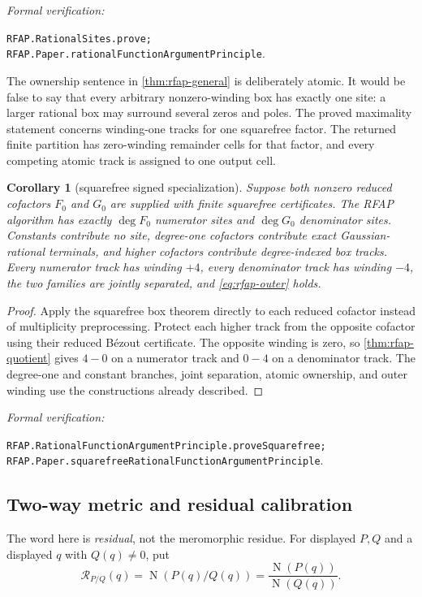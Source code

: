 \documentclass[11pt]{article}
\newtheorem{corollary}[theorem]{Corollary}
\newcommand{\Norm}[1]{\operatorname{N}\!\left(#1\right)}
\newcommand{\leanref}[1]{\par\smallskip\noindent
  \emph{Formal verification:}\par\nobreak
  {\raggedright\nolinkurl{#1}.\par}}
\begin{document}
\leanref{RFAP.RationalSites.prove;
RFAP.Paper.rationalFunctionArgumentPrinciple}

The ownership sentence in \cref{thm:rfap-general} is deliberately atomic.
It would be false to say that every arbitrary nonzero-winding box has exactly
one site: a larger rational box may surround several zeros and poles.  The
proved maximality statement concerns winding-one tracks for one squarefree
factor.  The returned finite partition has zero-winding remainder cells for
that factor, and every competing atomic track is assigned to one output cell.

\begin{corollary}[squarefree signed specialization]
\label{cor:rfap-squarefree}
Suppose both nonzero reduced cofactors $F_0$ and $G_0$ are supplied with
finite squarefree certificates.  The RFAP algorithm has exactly $\deg F_0$
numerator sites and $\deg G_0$ denominator sites.  Constants contribute no
site, degree-one cofactors contribute exact Gaussian-rational terminals, and
higher cofactors contribute degree-indexed box tracks.  Every numerator
track has winding $+4$, every denominator track has winding $-4$, the two
families are jointly separated, and \eqref{eq:rfap-outer} holds.
\end{corollary}

\begin{proof}
Apply the squarefree box theorem directly to each reduced cofactor instead
of multiplicity preprocessing.  Protect each higher track from the opposite
cofactor using their reduced Bézout certificate.  The opposite winding is
zero, so \cref{thm:rfap-quotient} gives $4-0$ on a numerator track and
$0-4$ on a denominator track.  The degree-one and constant branches, joint separation,
atomic ownership, and outer winding use the constructions already described.
\end{proof}

\leanref{RFAP.RationalFunctionArgumentPrinciple.proveSquarefree;
RFAP.Paper.squarefreeRationalFunctionArgumentPrinciple}

\subsection{Two-way metric and residual calibration}

The word here is \emph{residual}, not the meromorphic residue.  For displayed
$P,Q$ and a displayed $q$ with $Q(q)\ne0$, put
\begin{equation}
\label{eq:quotient-residual}
       \mathcal R_{P/Q}(q)=\Norm{P(q)/Q(q)}
       =\frac{\Norm{P(q)}}{\Norm{Q(q)}}.
\end{equation}
\end{document}
